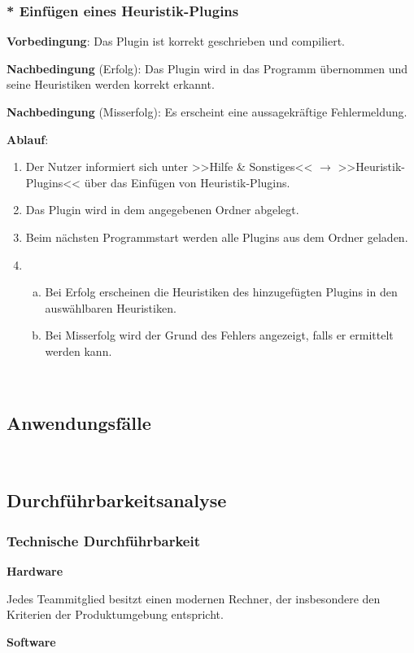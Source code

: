 \documentclass{article}
\begin{document}
	\subsubsection{* Einfügen eines Heuristik-Plugins}
	\textbf{Vorbedingung}: Das Plugin ist korrekt geschrieben und compiliert.
	
	\textbf{Nachbedingung} (Erfolg): Das Plugin wird in das Programm übernommen und seine Heuristiken werden korrekt erkannt.
	
	\textbf{Nachbedingung} (Misserfolg): Es erscheint eine aussagekräftige Fehlermeldung.
	
	\textbf{Ablauf}:
	\begin{enumerate}[1)]
		\item{Der Nutzer informiert sich unter >>Hilfe \& Sonstiges<< $\rightarrow$ >>Heuristik-Plugins<< über das Einfügen von Heuristik-Plugins.}
		\item{Das Plugin wird in dem angegebenen Ordner abgelegt.}
		\item{Beim nächsten Programmstart werden alle Plugins aus dem Ordner geladen.}
		\item{
			\begin{enumerate}[a)]
				\item{Bei Erfolg erscheinen die Heuristiken des hinzugefügten Plugins in den auswählbaren Heuristiken.}
				\item{Bei Misserfolg wird der Grund des Fehlers angezeigt, falls er ermittelt werden kann.}
			\end{enumerate}
		}
	\end{enumerate}

	~\newpage
	\subsection{Anwendungsfälle}
	
	~\newpage
	\subsection{Durchführbarkeitsanalyse}
	\subsubsection{Technische Durchführbarkeit}
	\textbf{Hardware}
	
	Jedes Teammitglied besitzt einen modernen Rechner, der insbesondere den Kriterien der Produktumgebung entspricht.
	\newline
	
	\textbf{Software}
	
\end{document}
